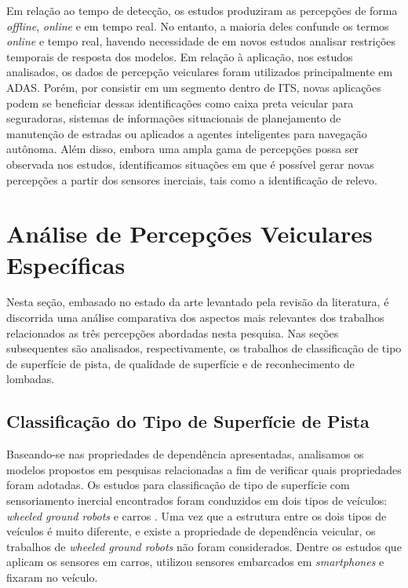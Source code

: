 Em relação ao tempo de detecção, os estudos produziram as percepções de forma \textit{offline}, \textit{online} e em tempo real. No entanto, a maioria deles confunde os termos \textit{online} e tempo real, havendo necessidade de em novos estudos analisar restrições temporais de resposta dos modelos. Em relação à aplicação, nos estudos analisados, os dados de percepção veiculares foram utilizados principalmente em ADAS. Porém, por consistir em um segmento dentro de ITS, novas aplicações podem se beneficiar dessas identificações como caixa preta veicular para seguradoras, sistemas de informações situacionais de planejamento de manutenção de estradas ou aplicados a agentes inteligentes para navegação autônoma. Além disso, embora uma ampla gama de percepções possa ser observada nos estudos, identificamos situações em que é possível gerar novas percepções a partir dos sensores inerciais, tais como a identificação de relevo.

\section{Análise de Percepções Veiculares Específicas}

Nesta seção, embasado no estado da arte levantado pela revisão da literatura, é discorrida uma análise comparativa dos aspectos mais relevantes dos trabalhos relacionados  as três percepções abordadas nesta pesquisa. Nas seções subsequentes são analisados, respectivamente, os trabalhos de classificação de tipo de superfície de pista, de qualidade de superfície e de reconhecimento de lombadas.

\subsection{Classificação do Tipo de Superfície de Pista}

Baseando-se nas propriedades de dependência apresentadas, analisamos os modelos propostos em pesquisas relacionadas a fim de verificar quais propriedades foram adotadas. Os estudos para classificação de tipo de superfície com sensoriamento inercial encontrados foram conduzidos em dois tipos de veículos: \textit{wheeled ground robots} \cite{Khaleghian2017, Sebastian2019, Tolentino-Rabelo2016} e carros \cite{Souza2018, Wang2018_1, Wang2017}. Uma vez que a estrutura entre os dois tipos de veículos é muito diferente, e existe a propriedade de dependência veicular, os trabalhos de \textit{wheeled ground robots} não foram considerados. Dentre os estudos que aplicam os sensores em carros, \cite{Souza2018} utilizou sensores embarcados em \textit{smartphones} e \cite{Wang2018_1, Wang2017} fixaram no veículo. 

